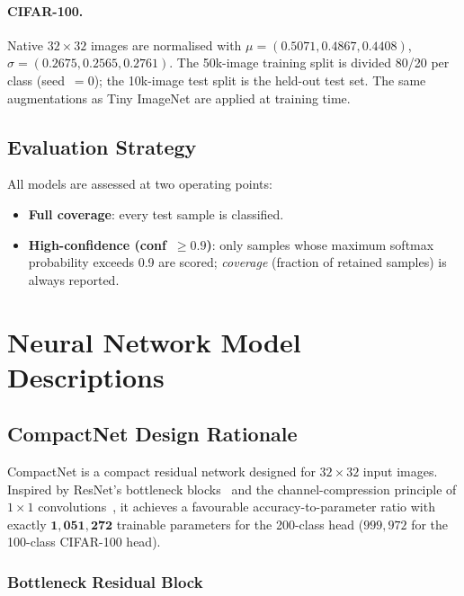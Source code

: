 \documentclass[11pt,letterpaper]{article}
\begin{document}
\paragraph{CIFAR-100.}
Native $32\!\times\!32$ images are normalised with
$\mu = (0.5071, 0.4867, 0.4408)$,
$\sigma = (0.2675, 0.2565, 0.2761)$.
The 50k-image training split is divided 80/20 per class (seed~$=0$);
the 10k-image test split is the held-out test set.
The same augmentations as Tiny ImageNet are applied at training time.

\subsection{Evaluation Strategy}

All models are assessed at two operating points:
\begin{itemize}[noitemsep]
  \item \textbf{Full coverage}: every test sample is classified.
  \item \textbf{High-confidence (conf~$\geq 0.9$)}: only samples whose maximum
        softmax probability exceeds 0.9 are scored;
        \emph{coverage} (fraction of retained samples) is always reported.
\end{itemize}

\section{Neural Network Model Descriptions}

\subsection{CompactNet Design Rationale}

CompactNet is a compact residual network designed for $32\!\times\!32$ input images.
Inspired by ResNet's bottleneck blocks~\cite{he2016deep} and the channel-compression
principle of $1\!\times\!1$ convolutions~\cite{lin2013network}, it achieves a
favourable accuracy-to-parameter ratio with exactly
$\mathbf{1{,}051{,}272}$ trainable parameters for the 200-class head
($999{,}972$ for the 100-class CIFAR-100 head).

\subsubsection{Bottleneck Residual Block}
\end{document}
